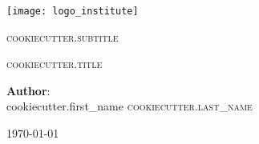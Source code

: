 \documentclass[main.tex]{subfiles}
\begin{document}
\begin{titlepage}


  	  \begin{minipage}{0.4\textwidth}
  		  \begin{flushright}
  			  \texttt{[image: logo\_institute]}
  		  \end{flushright}
   	  \end{minipage}

  	  \begin{center}
   		 \vfill
  	     \textsc{\Large {{cookiecutter.subtitle}} }\\ [1cm]


    	 {\Huge \textsc{ {{cookiecutter.title}} } \par}

  	    \vfill

      	 {\large \textbf{Author}:\\
	    	{{cookiecutter.first_name}} \textsc{ {{cookiecutter.last_name}} }\\[0.5cm]}

    	\vfill

   		{\large \today}
 	 \end{center}


\end{titlepage}
\end{document}
